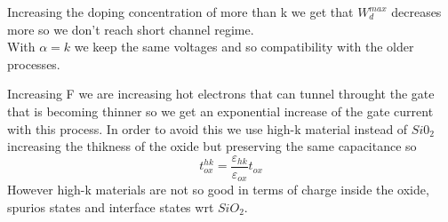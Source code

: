 \vspace{5mm}

Increasing the doping concentration of more than k we get that $W_d^{max}$ decreases more so we don't reach short channel regime.\\
With $\alpha=k$ we keep the same voltages and so compatibility with the older processes.\\

\vspace{5mm}

Increasing F we are increasing hot electrons that can tunnel throught the gate that is becoming thinner so we get an exponential increase of the gate current with this process. In order to avoid this we use high-k material instead of $Si0_2$ increasing the thikness of the oxide but preserving the same capacitance so 
\begin{equation}
t_{ox}^{hk}=\frac{\varepsilon_{hk}}{\varepsilon_{ox}}t_{ox}
\end{equation}
However high-k materials are not so good in terms of charge inside the oxide, spurios states and interface states wrt $SiO_2$.\\ 


